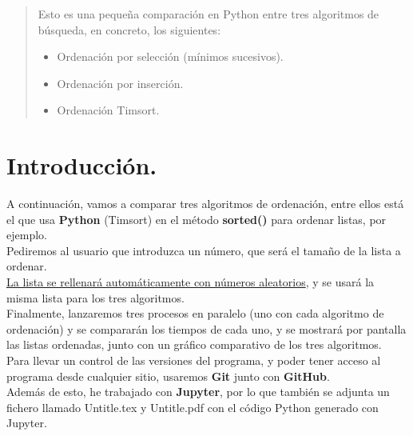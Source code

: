\documentclass[a4,12pt]{article}
\begin{document}
	
	
		
	
	
	\tableofcontents
	
		\begin{abstract}
			Esto es una pequeña comparación en Python entre tres algoritmos de búsqueda, en concreto, los siguientes:
			\begin{itemize}
				\item Ordenación por selección (mínimos sucesivos).
				\item Ordenación por inserción.
				\item Ordenación Timsort.
			\end{itemize}
		\end{abstract}
	
	\newpage
	
	\section{Introducción.}
	
	A continuación, vamos a comparar tres algoritmos de ordenación, entre ellos está el que usa \textbf{Python} (Timsort) en el método \textbf{sorted()} para ordenar listas, por ejemplo.\\
	
	Pediremos al usuario que introduzca un número, que será el tamaño de la lista a ordenar.\\
	
	\underline{La lista se rellenará automáticamente con números aleatorios}, y se usará la misma lista para los tres algoritmos.\\
	
	Finalmente, lanzaremos tres procesos en paralelo (uno con cada algoritmo de ordenación) y se compararán los tiempos de cada uno, y se mostrará por pantalla las listas ordenadas, junto con un gráfico comparativo de los tres algoritmos.\\
	
	Para llevar un control de las versiones del programa, y poder tener acceso al programa desde cualquier sitio, usaremos \textbf{Git} junto con \textbf{GitHub}.\\
	
	Además de esto, he trabajado con \textbf{Jupyter}, por lo que también se adjunta un fichero llamado Untitle.tex y Untitle.pdf con el código Python generado con Jupyter.
	
\end{document}

